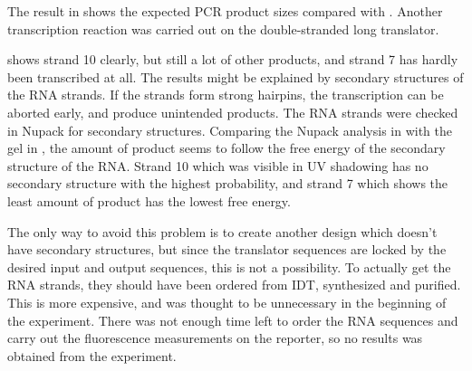 The result in  shows the expected PCR product sizes compared with . Another transcription reaction was carried out on the double-stranded long translator.

 shows strand 10 clearly, but still a lot of other products, and strand 7 has hardly been transcribed at all. The results might be explained by secondary structures of the RNA strands. If the strands form strong hairpins, the transcription can be aborted early, and produce unintended products. The RNA strands were checked in Nupack for secondary structures. Comparing the Nupack analysis in  with the gel in , the amount of product seems to follow the free energy of the secondary structure of the RNA. Strand 10 which was visible in UV shadowing has no secondary structure with the highest probability, and strand 7 which shows the least amount of product has the lowest free energy.

The only way to avoid this problem is to create another design which doesn't have secondary structures, but since the translator sequences are locked by the desired input and output sequences, this is not a possibility. To actually get the RNA strands, they should have been ordered from IDT, synthesized and purified. This is more expensive, and was thought to be unnecessary in the beginning of the experiment. There was not enough time left to order the RNA sequences and carry out the fluorescence measurements on the reporter, so no results was obtained from the experiment.
